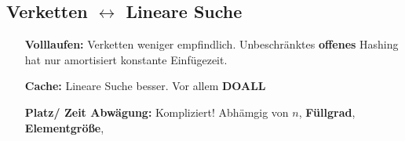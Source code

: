 \subsection*{Verketten $\leftrightarrow$ Lineare Suche}
\begin{itemize}
    \item [\textbf{Volllaufen:}] Verketten weniger empfindlich. Unbeschränktes \textbf{offenes} Hashing hat nur amortisiert konstante Einfügezeit.
    \item [\textbf{Cache: }]Lineare Suche besser. Vor allem \textbf{DOALL}
    \item [\textbf{Platz/ Zeit Abwägung: }] Kompliziert! Abhämgig von $n$, \textbf{Füllgrad}, \textbf{Elementgröße}, 
\end{itemize}